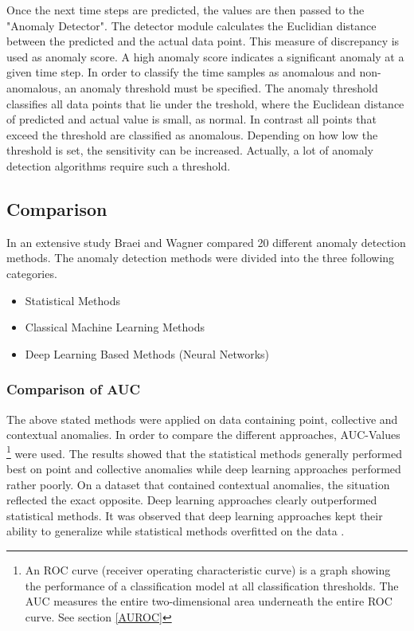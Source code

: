 Once the next time steps are predicted, the values are then passed to the "Anomaly Detector". The detector module calculates the Euclidian distance between the predicted and the actual data point. This measure of discrepancy is used as anomaly score. A high anomaly score indicates a significant anomaly at a given time step. In order to classify the time samples as anomalous and non-anomalous, an anomaly threshold must be specified. The anomaly threshold classifies all data points that lie under the treshold, where the Euclidean distance of predicted and actual value is small, as normal. In contrast all points that exceed the threshold are classified as anomalous. Depending on how low the threshold is set, the sensitivity can be increased. Actually, a lot of anomaly detection algorithms require such a threshold.


\subsection{Comparison} \label{comparison}
In an extensive study Braei and Wagner \parencite*{Braei2020} compared 20 different anomaly detection methods. The anomaly detection methods were divided into the three following  categories. 

\begin{itemize}
	\item Statistical Methods
	\item Classical Machine Learning Methods
	\item Deep Learning Based Methods (Neural Networks)
\end{itemize}


\subsubsection{Comparison of AUC}
The above stated methods were applied on data containing point, collective and contextual anomalies. In order to compare the different approaches, AUC-Values \footnote{An ROC curve (receiver operating characteristic curve) is a graph showing the performance of a classification model at all classification thresholds. The AUC measures the entire two-dimensional area underneath the entire ROC curve. See section \ref{AUROC}} were used. The results showed that the statistical methods generally performed best on point and collective anomalies while deep learning approaches performed rather poorly. On a dataset that contained contextual anomalies, the situation reflected the exact opposite. Deep learning approaches clearly outperformed statistical methods. It was observed that deep learning approaches kept their ability to generalize while statistical methods overfitted on the data \parencite{Braei2020}.

